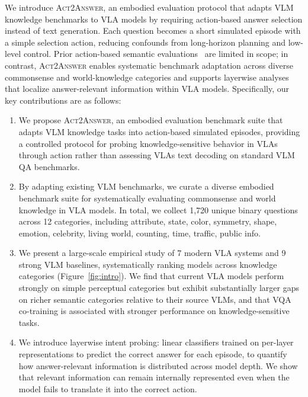 \documentclass{llmxive}
\begin{document}
We introduce \textsc{Act2Answer}, an embodied evaluation protocol that adapts VLM knowledge benchmarks to VLA models by requiring action-based answer selection instead of text generation.
Each question becomes a short simulated episode with a simple selection action, reducing confounds from long-horizon planning and low-level control.
Prior action-based semantic evaluations~\citep{zitkovich2023rt,openvla} are limited in scope; in contrast, \textsc{Act2Answer} enables systematic benchmark adaptation across diverse commonsense and world-knowledge categories and supports layerwise analyses that localize answer-relevant information within VLA models. Specifically, our key contributions are as follows:
\begin{enumerate}
    \item We propose \textsc{Act2Answer}, an embodied evaluation benchmark suite that adapts VLM knowledge tasks into action-based simulated episodes, providing a controlled protocol for probing knowledge-sensitive behavior in VLAs through action rather than assessing VLAs text decoding on standard VLM QA benchmarks.
    
    \item By adapting existing VLM benchmarks, we curate a diverse embodied benchmark suite for systematically evaluating commonsense and world knowledge in VLA models.
    In total, we collect 1,720 unique binary questions across 12 categories, including attribute, state, color, symmetry, shape, emotion, celebrity, living world, counting, time, traffic, public info.
    
    \item We present a large-scale empirical study of 7 modern VLA systems and 9 strong VLM baselines, systematically ranking models across knowledge categories (Figure~\ref{fig:intro}).
    We find that current VLA models perform strongly on simple perceptual categories but exhibit substantially larger gaps on richer semantic categories relative to their source VLMs, and that VQA co-training is associated with stronger performance on knowledge-sensitive tasks.
    
    \item We introduce layerwise intent probing: linear classifiers trained on per-layer representations to predict the correct answer for each episode, to quantify how answer-relevant information is distributed across model depth.
    We show that relevant information can remain internally represented even when the model fails to translate it into the correct action.
\end{enumerate}
\end{document}
